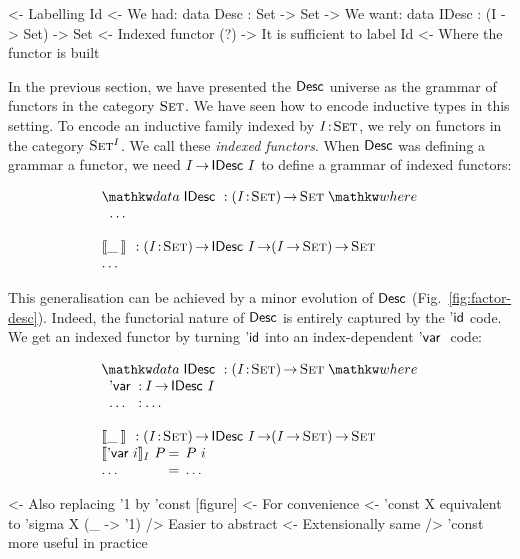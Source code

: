 \begin{wstructure}
<- Labelling Id
    <- We had: data Desc : Set -> Set
    -> We want: data IDesc : (I -> Set) -> Set
        <- Indexed functor (?)
        -> It is sufficient to label Id
            <- Where the functor is built
\end{wstructure}

In the previous section, we have presented the $\Desc$ universe as the
grammar of functors in the category $\Set$. We have seen how to encode
inductive types in this setting. To encode an inductive family indexed
by $\Bhab{\V{I}}{\Set}$, we rely on functors in the category
$\Set^I$. We call these \emph{indexed functors}. When $\Desc$ was
defining a grammar a functor, we need $I \To \IDesc{I}$ to define a
grammar of indexed functors:

\[\stk{
\data \IDesc{} : \PI{\V{I}}{\Set} \Set \where \\
\;\;\ldots \\
\\
\idescop{\_\:}{}{} : \PI{\V{I}}{\Set} \IDesc{I} \To (\V{I} \To \Set) \To \Set    \\
\ldots
}\]

This generalisation can be achieved by a minor evolution of $\Desc$
(Fig.~\ref{fig:factor-desc}). Indeed, the functorial nature of $\Desc$
is entirely captured by the $\DId$ code. We get an indexed functor
by turning $\DId$ into an index-dependent $\DVar$ code:

\[\stk{
\data \IDesc{} : \PI{\V{I}}{\Set} \Set \where \\
\;\;\begin{array}{@{}l@{\::\:}l@{\quad}l}
    \DVar{}         & I \To \IDesc{I}                                   \\
    \ldots          & \ldots
\end{array} \\
\\
\idescop{\_\:}{}{} : \PI{\V{I}}{\Set} \IDesc{I} \To (\V{I} \To \Set) \To \Set        \\
\begin{array}{@{}l@{\:=\:\:}ll}
\idescop{\DVar{i}}{I}{P}      &  P~i                                                 \\
\ldots                        &  \ldots
\end{array}
}\]

\begin{wstructure}
<- Also replacing '1 by 'const  [figure]
    <- For convenience
        <- 'const X equivalent to 'sigma X (\_ -> '1)
        /> Easier to abstract
            <- Extensionally same
            /> 'const more useful in practice
\end{wstructure}

